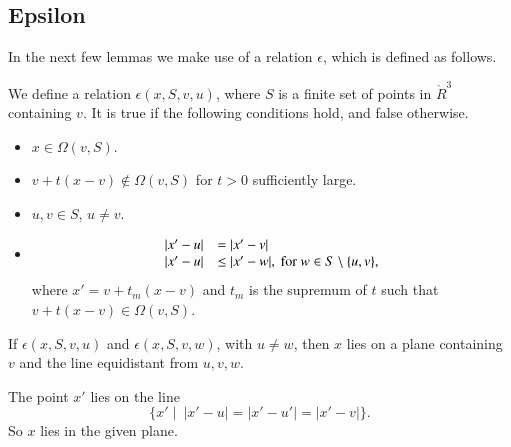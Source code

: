 \begin{tarskidata}
\begin{tarski}

\section{Epsilon}
In the next few lemmas we make use of a relation
$\epsilon$, which is defined as follows.
\begin{definition}[$\epsilon$]
We define a relation $\epsilon(x,S,v,u)$, where $S$ is
a finite set of points in $\ring{R}^3$ containing $v$.  It is true if
the following conditions hold, and false otherwise.
\begin{itemize}
 \item $x\in \Omega(v,S)$.
 \item $v + t(x-v)\not\in\Omega(v,S)$ for
$t>0$ sufficiently large.
  \item $u,v\in S$, $u\ne v$.
 \item \begin{equation}\tlabel{fine:eps-test}
     \begin{array}{lll}
   |x'-u| &= |x'-v|\\
   |x'-u| &\le |x'-w|,\text{ for } w\in S\setminus\{u,v\},
   \end{array}
   \end{equation}
  where $x' = v+t_m (x-v)$ and $t_m$ is the supremum of $t$
  such that $v+t(x-v)\in\Omega(v,S)$.
\end{itemize}
\end{definition}
\end{tarski}


\begin{tarski}

\begin{lemma}
If $\epsilon(x,S,v,u)$ and $\epsilon(x,S,v,w)$,
with $u\ne w$, then
   $x$ lies on a plane containing $v$ and the line equidistant
from $u,v,w$.  
\end{lemma}

\begin{proved}  The point $x'$ lies on the line
   $$\{x' \mid \ |x'-u|=|x'-u'|=|x'-v|\}.$$
So $x$ lies in the given plane.
\swallowed\end{proved}
\end{tarski}







\end{tarskidata}
